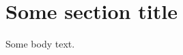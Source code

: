 \documentclass[12pt,a4paper]{article}
\begin{document}

\section{Some section title}
Some body text.

\end{document}
